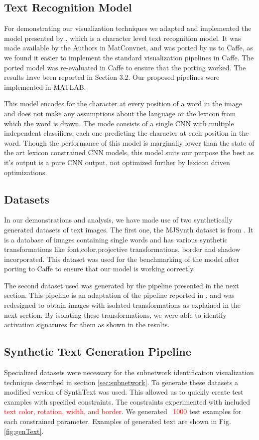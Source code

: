 \documentclass[10pt,twocolumn,letterpaper]{article}
\begin{document}
\subsection{Text Recognition Model}
For demonstrating our visualization techniques we adapted and implemented the model presented by \cite{Jaderberg14c}, which is a character level text recognition model. It was made available by the Authors in MatConvnet, and was ported by us to Caffe, as we found it easier to implement the standard visualization pipelines in Caffe. The ported model was re-evaluated in Caffe to ensure that the porting worked. The results have been reported in Section 3.2. Our proposed pipelines were implemented in MATLAB.

This  model encodes for the character at every position of a word in the image and does not make any assumptions about the language or the lexicon from which the word is drawn. The  mode consists of a single CNN with multiple independent classifiers, each one predicting the character at each position in the word. Though the performance of this model is marginally lower than the state of the art lexicon constrained CNN models, this model suits our purpose the best as it's output is a pure CNN output, not optimized further by lexicon driven optimizations.  

\subsection{Datasets}
In our demonstrations and analysis, we have made use of two synthetically generated datasets of text images. The first one, the MJSynth dataset is from \cite{Jaderberg14c}. It is a database of images containing single words and has various synthetic transformations like font,color,projective transformations, border and shadow incorporated. This dataset was used for the benchmarking of the model after porting to Caffe to ensure that our model is working correctly. 

The second dataset used was generated by the pipeline presented in the next section. This pipeline is an adaptation of the pipeline reported in \cite{Gupta16}, and was redesigned to obtain images with isolated transformations as explained in the next section. By isolating these transformations, we were able to identify activation signatures for them as shown in the results. 

\subsection{Synthetic Text Generation Pipeline} \label{sec:synthtext}
Specialized datasets were necessary for the subnetwork identification visualization technique described in section \ref{sec:subnetwork}.
To generate these datasets a modified version of SynthText \cite{Gupta16} was used. This allowed us to quickly create test examples with specified constraints. The constraints experimented with included \textcolor{red}{text color, rotation, width, and border}. We generated \textcolor{red}{~1000} test examples for each constrained parameter. Examples of generated text are shown in Fig. \ref{fig:genText}.
\end{document}
